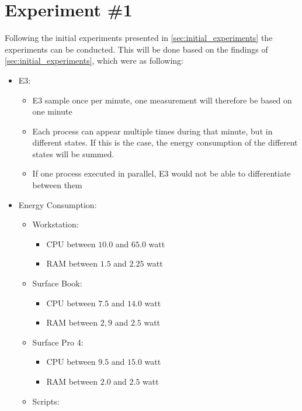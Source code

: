 \section{Experiment \#1}\label{sec:experiment_one}

Following the initial experiments presented in \cref{sec:initial_experiments} the experiments can be conducted. This will be done based on the findings of \cref{sec:initial_experiments}, which were as following:

\begin{itemize}
    \item E3:
    \begin{itemize}
        \item E3 sample once per minute, one measurement will therefore be based on one minute
        \item Each process can appear multiple times during that minute, but in different states. If this is the case, the energy consumption of the different states will be summed.
        \item If one process executed in parallel, E3 would not be able to differentiate between them
    \end{itemize}
    \item Energy Consumption:
    \begin{itemize}
        \item Workstation: 
        \begin{itemize}
            \item CPU between $10.0$ and $65.0$ watt
            \item RAM between $1.5$ and $2.25$ watt
        \end{itemize}
        \item Surface Book: 
        \begin{itemize}
            \item CPU between $7.5$ and $14.0$ watt
            \item RAM between $2,9$ and $2.5$ watt
        \end{itemize}
        \item Surface Pro 4: 
        \begin{itemize}
            \item CPU between $9.5$ and $15.0$ watt
            \item RAM between $2.0$ and $2.5$ watt
        \end{itemize}
        \item Scripts:
        \begin{itemize}

\end{itemize}
\end{itemize}
\end{itemize}
